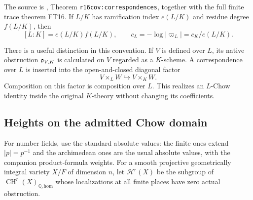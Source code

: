 \documentclass[11pt,a4paper]{article}
\theoremstyle{definition}
\theoremstyle{remark}\newtheorem{remark}[theorem]{Remark}
\numberwithin{equation}{section}
\newcommand{\Q}{\mathbb Q}\newcommand{\R}{\mathbb R}\newcommand{\C}{\mathbb C}
\newcommand{\CH}{\operatorname{CH}}\newcommand{\an}{\mathrm{an}}
\newcommand{\homol}{\mathrm{hom}}\newcommand{\BC}{\mathrm{BC}}
\begin{document}
The source is \cite{InternalCovariance}, Theorem
\texttt{r16cov:correspondences}, together with the full finite trace
theorem FT16. If $L/K$ has ramification index $e(L/K)$ and residue
degree $f(L/K)$, then
\begin{equation}\label{eq:local-normalization}
 [L:K]=e(L/K)f(L/K),\qquad
 c_L=-\log|\varpi_L|=c_K/e(L/K).
\end{equation}

There is a useful distinction in this convention. If $V$ is defined
over $L$, its native obstruction $\mathfrak o_{V,K}$ is calculated on $V$
regarded as a $K$-scheme. A correspondence over $L$ is inserted into
the open-and-closed diagonal factor
\[
       V\times_L W\hookrightarrow V\times_K W.
\]
Composition on this factor is composition over $L$. This realizes an
$L$-Chow identity inside the original $K$-theory without changing its
coefficients.

\subsection{Heights on the admitted Chow domain}\label{sub:height-input}

For number fields, use the standard absolute values: the finite ones
extend $|p|=p^{-1}$ and the archimedean ones are the usual absolute
values, with the companion product-formula weights. For a
smooth projective geometrically integral variety $X/F$ of dimension $n$,
let $\mathcal H^r(X)$ be the subgroup
of $\CH^r(X)_{\Q,\homol}$ whose localizations at all finite places
have zero actual obstruction.
\end{document}
